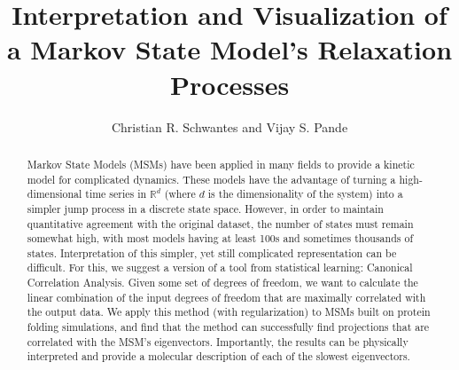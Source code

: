 \documentclass[onecolumn,floatfix,nofootinbib,aps,notitlepage]{revtex4-1}
\begin{document}
\title{Interpretation and Visualization of a Markov State Model's Relaxation Processes}
\author{Christian R. Schwantes and Vijay S. Pande}
\begin{abstract}
Markov State Models (MSMs) have been applied in many fields to provide a kinetic model for complicated dynamics. These models have the advantage of turning a high-dimensional time series in $\mathbb{R}^{d}$ (where $d$ is the dimensionality of the system) into a simpler jump process in a discrete state space. However, in order to maintain quantitative agreement with the original dataset, the number of states must remain somewhat high, with most models having at least 100s and sometimes thousands of states. Interpretation of this simpler, yet still complicated representation can be difficult. For this, we suggest a version of a tool from statistical learning: Canonical Correlation Analysis. Given some set of degrees of freedom, we want to calculate the linear combination of the input degrees of freedom that are maximally correlated with the output data. We apply this method (with regularization) to MSMs built on protein folding simulations, and find that the method can successfully find projections that are correlated with the MSM's eigenvectors. Importantly, the results can be physically interpreted and provide a molecular description of each of the slowest eigenvectors.
\end{abstract}
\maketitle
\end{document}

